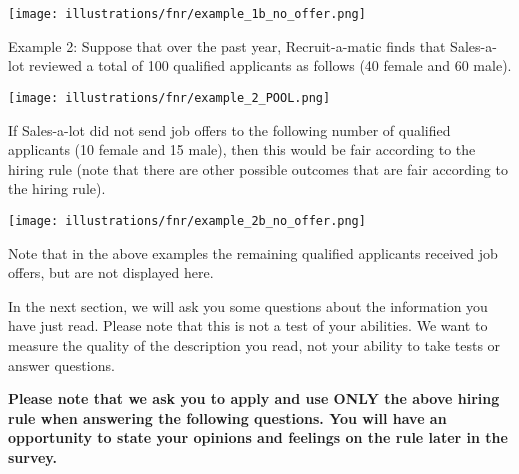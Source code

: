 \documentclass{article}
\begin{document}
\texttt{[image: illustrations/fnr/example\_1b\_no\_offer.png]}

Example 2: Suppose that over the past year, Recruit-a-matic finds that Sales-a-lot reviewed a total of 100 qualified applicants as follows (40 female and 60 male).

\texttt{[image: illustrations/fnr/example\_2\_POOL.png]}

If Sales-a-lot did not send job offers to the following number of qualified applicants (10 female and 15 male), then this would be fair according to the hiring rule (note that there are other possible outcomes that are fair according to the hiring rule).

\texttt{[image: illustrations/fnr/example\_2b\_no\_offer.png]}

Note that in the above examples the remaining qualified applicants received job offers, but are not displayed here.

In the next section, we will ask you some questions about the information you have just read. Please note that this is not a test of your abilities. We want to measure the quality of the description you read, not your ability to take tests or answer questions.

\textbf{Please note that we ask you to apply and use ONLY the above hiring rule when answering the following questions. You will have an opportunity to state your opinions and feelings on the rule later in the survey.}
\end{document}
